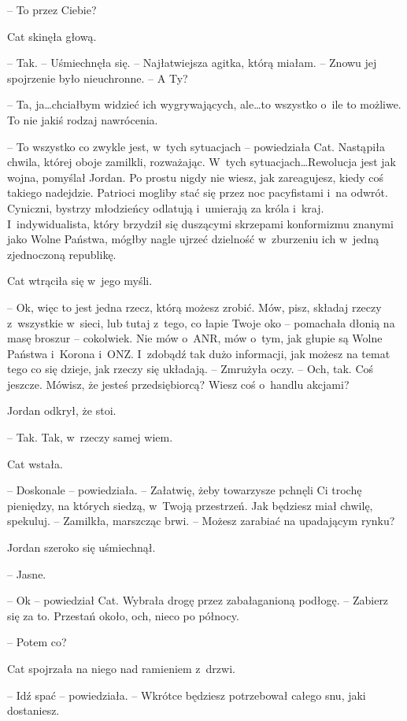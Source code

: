 \documentclass[oneside,polish,11pt,sfheadings]{mwbk}
\begin{document}
-- To przez Ciebie?

Cat skinęła głową. 

-- Tak. -- Uśmiechnęła się. -- Najłatwiejsza agitka,
którą miałam. -- Znowu jej spojrzenie było nieuchronne. -- A Ty?

-- Ta, ja\ldots chciałbym widzieć ich wygrywających, ale\ldots to wszyst\-ko o~ile to możliwe. To nie jakiś rodzaj nawrócenia.

-- To wszyst\-ko co zwykle jest, w~tych sytuacjach -- powiedziała Cat.
Nastąpiła chwila, której oboje zamilkli, rozważając. W~tych
sytuacjach\ldots Rewolucja jest jak wojna, pomyślał Jordan. Po prostu nigdy
nie wiesz, jak zareagujesz, kiedy coś takiego nadejdzie. Patrioci
mogliby stać się przez noc pacyfistami i~na odwrót. Cyniczni, bystrzy
młodzieńcy odlatują i~umierają za króla i~kraj. I~indywidualista, który
brzydził się duszącymi skrzepami konformizmu znanymi jako Wolne Państwa,
mógłby nagle ujrzeć dzielność w~zburzeniu ich w~jedną zjednoczoną
republikę.

Cat wtrąciła się w~jego myśli.

-- Ok, więc to jest jedna rzecz, którą możesz zrobić. Mów, pisz, składaj
rzeczy z~wszystkie w~sieci, lub tutaj z~tego, co łapie Twoje oko -- pomachała dłonią na masę broszur -- cokolwiek. Nie mów o~ANR, mów o~tym,
jak głupie są Wolne Państwa i~Korona i~ONZ. I~zdobądź tak dużo
informacji, jak możesz na temat tego co się dzieje, jak rzeczy się
układają. -- Zmrużyła oczy. -- Och, tak. Coś jeszcze. Mówisz, że jesteś
przedsiębiorcą? Wiesz coś o~handlu akcjami?

Jordan odkrył, że stoi. 

-- Tak. Tak, w~rzeczy samej wiem.

Cat wstała. 

-- Doskonale -- powiedziała. -- Załatwię, żeby towarzysze
pchnęli Ci trochę pieniędzy, na których siedzą, w~Twoją przestrzeń. Jak
będziesz miał chwilę, spekuluj. -- Zamilkła, marszcząc brwi. -- Możesz
zarabiać na upadającym rynku?

Jordan szeroko się uśmiechnął. 

-- Jasne.

-- Ok -- powiedział Cat. Wybrała drogę przez zabałaganioną podłogę. -- Zabierz się za to. Przestań około, och, nieco po północy.

-- Potem co?

Cat spojrzała na niego nad ramieniem z~drzwi. 

-- Idź spać -- powiedziała.
-- Wkrótce będziesz potrzebował całego snu, jaki dostaniesz.
\end{document}

